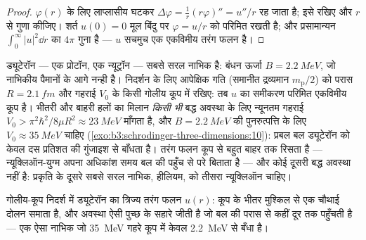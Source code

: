 \begin{proof}
$\varphi(r)$ के लिए लाप्लासीय घटकर $\Delta\varphi =
\tfrac1r(r\varphi)'' = u''/r$ रह जाता है; इसे रखिए और $r$ से गुणा
कीजिए। शर्त $u(0) = 0$ मूल बिंदु पर $\varphi = u/r$ को परिमित रखती है;
और प्रसामान्यन $\int_0^\infty|u|^2\dd r$ का $4\pi$ गुना है --- $u$
सचमुच एक एकविमीय तरंग फलन है।
\end{proof}

\begin{example}[ड्यूटेरॉन: बस-बस एक नाभिक]\label{ex:b3:schrodinger-three-dimensions:deuteron}
ड्यूटेरॉन --- एक प्रोटॉन, एक न्यूट्रॉन --- सबसे सरल नाभिक है:
बंधन ऊर्जा $B = \qty{2.2}{MeV}$, जो नाभिकीय पैमानों के आगे नन्ही है।
निदर्शन के लिए आपेक्षिक गति (समानीत द्रव्यमान $m_{\text{p}}/2$) को
परास $R = \qty{2.1}{fm}$ और गहराई $V_0$ के किसी गोलीय कूप में रखिए:
तब $u$ का समीकरण परिमित एकविमीय कूप है। भीतरी और बाहरी हलों का मिलान
\emph{किसी भी} बद्ध अवस्था के लिए न्यूनतम गहराई $V_0 > \pi^2\hbar^2/8\mu R^2
\approx \qty{23}{MeV}$ माँगता है, और
$B = \qty{2.2}{MeV}$ की पुनरुत्पत्ति के लिए $V_0 \approx \qty{35}{MeV}$
चाहिए (\cref{exo:b3:schrodinger-three-dimensions:10}): प्रबल बल
ड्यूटेरॉन को केवल दस प्रतिशत की गुंजाइश से बाँधता है। तरंग फलन
कूप से बहुत बाहर तक रिसता है --- न्यूक्लिऑन-युग्म अपना अधिकांश समय
बल की पहुँच से परे बिताता है --- और कोई दूसरी बद्ध अवस्था नहीं है:
प्रकृति के दूसरे सबसे सरल नाभिक, हीलियम, को तीसरा
न्यूक्लिऑन चाहिए।
\end{example}

\begin{omfigure}

{\small गोलीय-कूप निदर्श में ड्यूटेरॉन का त्रिज्य तरंग फलन $u(r)$:
कूप के भीतर मुश्किल से एक चौथाई दोलन समाता है, और अवस्था ऐसी पुच्छ के
सहारे जीती है जो बल की परास से कहीं दूर तक पहुँचती है --- एक ऐसा
नाभिक जो \qty{35}{MeV} गहरे कूप में केवल \qty{2.2}{MeV} से बँधा है।}
\end{omfigure}

